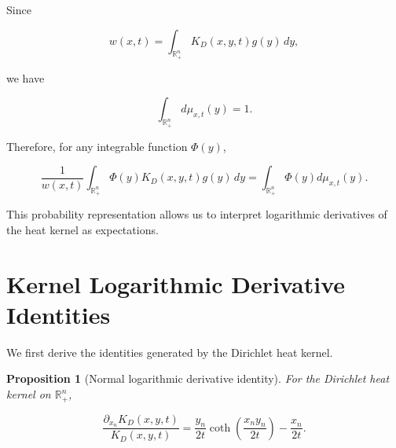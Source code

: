 \documentclass[11pt]{amsart}
\newtheorem{proposition}[theorem]{Proposition}
\theoremstyle{definition}
\theoremstyle{remark}
\begin{document}
Since

\[
w(x,t)
=
\int_{\mathbb R^n_+}
K_D(x,y,t)g(y)\,dy ,
\]

we have

\[
\int_{\mathbb R^n_+}
d\mu_{x,t}(y)=1 .
\]


Therefore, for any integrable function $\Phi(y)$,

\[
\frac1{w(x,t)}
\int_{\mathbb R^n_+}
\Phi(y)
K_D(x,y,t)g(y)\,dy
=
\int_{\mathbb R^n_+}
\Phi(y)d\mu_{x,t}(y).
\]

This probability representation allows us to interpret
logarithmic derivatives of the heat kernel as expectations.



\section{Kernel Logarithmic Derivative Identities}


We first derive the identities generated by the Dirichlet heat
kernel.


\begin{proposition}[Normal logarithmic derivative identity]

For the Dirichlet heat kernel on $\mathbb R^n_+$,

\[
\frac{\partial_{x_n}K_D(x,y,t)}
{K_D(x,y,t)}
=
\frac{y_n}{2t}
\coth
\left(
\frac{x_ny_n}{2t}
\right)
-
\frac{x_n}{2t}.
\]

\end{proposition}
\end{document}
